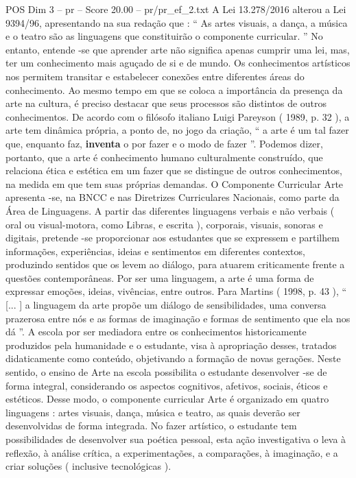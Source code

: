 \begin{textsample}{POS Dim 3 – pr – Score 20.00 – pr/pr\_ef\_2.txt}
A Lei 13.278/2016 alterou a Lei 9394/96, apresentando na sua redação que : “ As artes visuais, a dança, a música e o teatro são as linguagens que constituirão o componente curricular. ” No entanto, entende -se que aprender arte não significa apenas cumprir uma lei, mas, ter um conhecimento mais aguçado de si e de mundo.
Os conhecimentos artísticos nos permitem transitar e estabelecer conexões entre diferentes áreas do conhecimento.
Ao mesmo tempo em que se coloca a importância da presença da arte na cultura, é preciso destacar que seus processos são distintos de outros conhecimentos.
De acordo com o filósofo italiano Luigi Pareyson ( 1989, p. 32 ), a arte tem dinâmica própria, a ponto de, no jogo da criação, “ a arte é um tal fazer que, enquanto faz, \textbf{inventa} o por fazer e o modo de fazer ”.
Podemos dizer, portanto, que a arte é conhecimento humano culturalmente construído, que relaciona ética e estética em um fazer que se distingue de outros conhecimentos, na medida em que tem suas próprias demandas.
O Componente Curricular Arte apresenta -se, na BNCC e nas Diretrizes Curriculares Nacionais, como parte da Área de Linguagens.
A partir das diferentes linguagens verbais e não verbais ( oral ou visual-motora, como Libras, e escrita ), corporais, visuais, sonoras e digitais, pretende -se proporcionar aos estudantes que se expressem e partilhem informações, experiências, ideias e sentimentos em diferentes contextos, produzindo sentidos que os levem ao diálogo, para atuarem criticamente frente a questões contemporâneas.
Por ser uma linguagem, a arte é uma forma de expressar emoções, ideias, vivências, entre outros.
Para Martins ( 1998, p. 43 ), “ [... ] a linguagem da arte propõe um diálogo de sensibilidades, uma conversa prazerosa entre nós e as formas de imaginação e formas de sentimento que ela nos dá ”.
A escola por ser mediadora entre os conhecimentos historicamente produzidos pela humanidade e o estudante, visa à apropriação desses, tratados didaticamente como conteúdo, objetivando a formação de novas gerações.
Neste sentido, o ensino de Arte na escola possibilita o estudante desenvolver -se de forma integral, considerando os aspectos cognitivos, afetivos, sociais, éticos e estéticos.
Desse modo, o componente curricular Arte é organizado em quatro linguagens : artes visuais, dança, música e teatro, as quais deverão ser desenvolvidas de forma integrada.
No fazer artístico, o estudante tem possibilidades de desenvolver sua poética pessoal, esta ação investigativa o leva à reflexão, à análise crítica, a experimentações, a comparações, à imaginação, e a criar soluções ( inclusive tecnológicas ).

\end{textsample}
